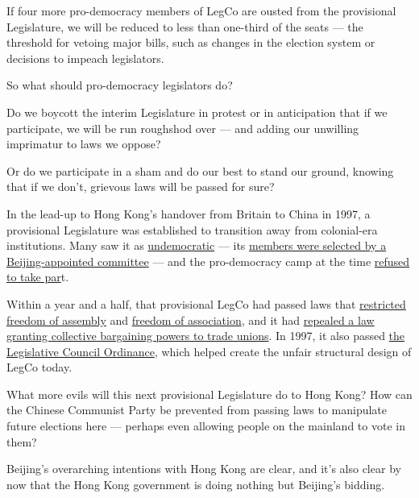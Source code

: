 If four more pro-democracy members of LegCo are ousted from the
provisional Legislature, we will be reduced to less than one-third of
the seats --- the threshold for vetoing major bills, such as changes in
the election system or decisions to impeach legislators.

So what should pro-democracy legislators do?

Do we boycott the interim Legislature in protest or in anticipation that
if we participate, we will be run roughshod over --- and adding our
unwilling imprimatur to laws we oppose?

Or do we participate in a sham and do our best to stand our ground,
knowing that if we don't, grievous laws will be passed for sure?

In the lead-up to Hong Kong's handover from Britain to China in 1997, a
provisional Legislature was established to transition away from
colonial-era institutions. Many saw it as
\href{https://www.hrw.org/legacy/press/pro-legi.htm}{undemocratic} ---
its
\href{https://www.scmp.com/news/hong-kong/education-community/article/2012978/explained-how-hong-kongs-legislative-council-has}{members
were selected by a Beijing-appointed committee} --- and the
pro-democracy camp at the time
\href{http://www.ipsnews.net/1996/12/hong-kong-two-legislatures-one-in-hong-kong-one-in-shenzhen/}{refused
to take par}t.

Within a year and a half, that provisional LegCo had passed laws that
\href{https://www.justicecentre.org.hk/framework/uploads/2018/11/HKUPR-Coalition-Fact-Sheet-Freedom-of-Assembly-Rights-and-Public-Order-Ordinance.pdf}{restricted
freedom of assembly} and
\href{https://hongkongfp.com/2018/07/19/explainer-hong-kong-seeking-ban-pro-independence-party-using-existing-national-security-laws/}{freedom
of association}, and it had
\href{https://www.legco.gov.hk/yr98-99/chinese/hc/papers/hc2711-m1-ec.pdf}{repealed
a law granting collective bargaining powers to trade unions}. In 1997,
it also passed
\href{https://www.legco.gov.hk/general/chinese/procedur/companion/chapter_3/mcp-part1-ch3-n11-ce.pdf}{the
Legislative Council Ordinance}, which helped create the unfair
structural design of LegCo today.

What more evils will this next provisional Legislature do to Hong Kong?
How can the Chinese Communist Party be prevented from passing laws to
manipulate future elections here --- perhaps even allowing people on the
mainland to vote in them?

Beijing's overarching intentions with Hong Kong are clear, and it's also
clear by now that the Hong Kong government is doing nothing but
Beijing's bidding.

